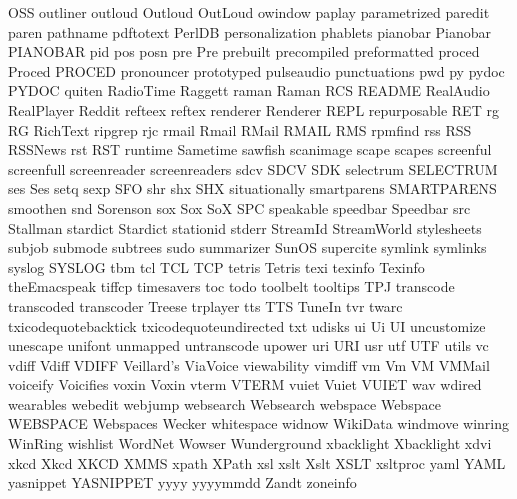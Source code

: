 OSS
outliner
outloud
Outloud
OutLoud
owindow
paplay
parametrized
paredit
paren
pathname
pdftotext
PerlDB
personalization
phablets
pianobar
Pianobar
PIANOBAR
pid
pos
posn
pre
Pre
prebuilt
precompiled
preformatted
proced
Proced
PROCED
pronouncer
prototyped
pulseaudio
punctuations
pwd
py
pydoc
PYDOC
quiten
RadioTime
Raggett
raman
Raman
RCS
README
RealAudio
RealPlayer
Reddit
refteex
reftex
renderer
Renderer
REPL
repurposable
RET
rg
RG
RichText
ripgrep
rjc
rmail
Rmail
RMail
RMAIL
RMS
rpmfind
rss
RSS
RSSNews
rst
RST
runtime
Sametime
sawfish
scanimage
scape
scapes
screenful
screenfull
screenreader
screenreaders
sdcv
SDCV
SDK
selectrum
SELECTRUM
ses
Ses
setq
sexp
SFO
shr
shx
SHX
situationally
smartparens
SMARTPARENS
smoothen
snd
Sorenson
sox
Sox
SoX
SPC
speakable
speedbar
Speedbar
src
Stallman
stardict
Stardict
stationid
stderr
StreamId
StreamWorld
stylesheets
subjob
submode
subtrees
sudo
summarizer
SunOS
supercite
symlink
symlinks
syslog
SYSLOG
tbm
tcl
TCL
TCP
tetris
Tetris
texi
texinfo
Texinfo
theEmacspeak
tiffcp
timesavers
toc
todo
toolbelt
tooltips
TPJ
transcode
transcoded
transcoder
Treese
trplayer
tts
TTS
TuneIn
tvr
twarc
txicodequotebacktick
txicodequoteundirected
txt
udisks
ui
Ui
UI
uncustomize
unescape
unifont
unmapped
untranscode
upower
uri
URI
usr
utf
UTF
utils
vc
vdiff
Vdiff
VDIFF
Veillard's
ViaVoice
viewability
vimdiff
vm
Vm
VM
VMMail
voiceify
Voicifies
voxin
Voxin
vterm
VTERM
vuiet
Vuiet
VUIET
wav
wdired
wearables
webedit
webjump
websearch
Websearch
webspace
Webspace
WEBSPACE
Webspaces
Wecker
whitespace
widnow
WikiData
windmove
winring
WinRing
wishlist
WordNet
Wowser
Wunderground
xbacklight
Xbacklight
xdvi
xkcd
Xkcd
XKCD
XMMS
xpath
XPath
xsl
xslt
Xslt
XSLT
xsltproc
yaml
YAML
yasnippet
YASNIPPET
yyyy
yyyymmdd
Zandt
zoneinfo
